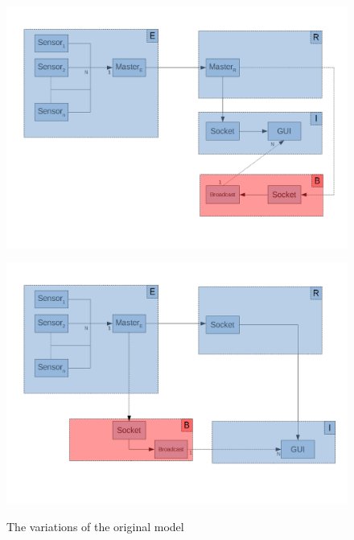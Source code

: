 \begin{figure}[H]
	\centering
	\begin{minipage}{.49\textwidth}
		\centering
		\includegraphics[width=\linewidth]{ERBI-Model-EtherCat}
		\label{fig:catmodel}
	\end{minipage}
	\begin{minipage}{.49\textwidth}
		\centering
		\includegraphics[width=\linewidth]{ERBI-Model-TCP}
		\label{fig:netmodel}
	\end{minipage}
	\caption{The variations of the original model}
	\label{fig:firstmodel}
\end{figure}

